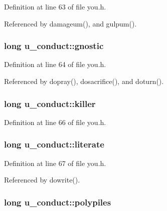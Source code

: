 Definition at line 63 of file you.\+h.



Referenced by damageum(), and gulpum().

\hypertarget{structu__conduct_adb446fda8db21ba87c4dccfc6e7c75e6}{
\subsubsection[{gnostic}]{\setlength{\rightskip}{0pt plus 5cm}long u\+\_\+conduct\+::gnostic}}\label{structu__conduct_adb446fda8db21ba87c4dccfc6e7c75e6}


Definition at line 64 of file you.\+h.



Referenced by dopray(), dosacrifice(), and doturn().

\hypertarget{structu__conduct_a8d10ce4f9c867d2fdc4656e06ab28582}{
\subsubsection[{killer}]{\setlength{\rightskip}{0pt plus 5cm}long u\+\_\+conduct\+::killer}}\label{structu__conduct_a8d10ce4f9c867d2fdc4656e06ab28582}


Definition at line 66 of file you.\+h.

\hypertarget{structu__conduct_a77dfbeafba9b3246900584c73eded17d}{
\subsubsection[{literate}]{\setlength{\rightskip}{0pt plus 5cm}long u\+\_\+conduct\+::literate}}\label{structu__conduct_a77dfbeafba9b3246900584c73eded17d}


Definition at line 67 of file you.\+h.



Referenced by dowrite().

\hypertarget{structu__conduct_a58879573cbdba47a68e09699703d926e}{
\subsubsection[{polypiles}]{\setlength{\rightskip}{0pt plus 5cm}long u\+\_\+conduct\+::polypiles}}\label{structu__conduct_a58879573cbdba47a68e09699703d926e}


